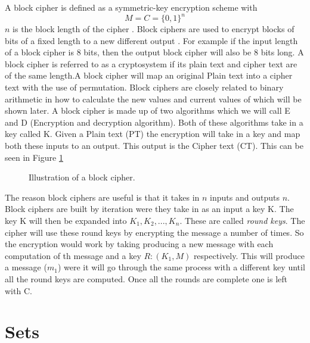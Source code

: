 \documentclass[11pt,a4paper]{report}
\begin{document}
A block cipher is defined as a symmetric-key encryption scheme with
\begin{displaymath}
 M = C = \{0,1\}^{n}
\end{displaymath}
$n$ is the block length of the cipher \cite{DBLP:series/isc/DelfsK07}. Block ciphers are used to encrypt blocks of bits of a fixed length to a new different output \cite{DBLP:books/sp/Buchmann02}. For example if the input length of a block cipher is 8 bits, then the output block cipher will also be 8 bits long. A block cipher is referred to as a cryptosystem if its plain text and cipher text are of the same length.A block cipher will map an original Plain text into a cipher text with the use of permutation. Block ciphers are closely related to binary arithmetic in how to calculate the new values and current values of which will be shown later.
A block cipher is made up of two algorithms which we will call E and D (Encryption and decryption algorithm). Both of these algorithms take in a key called K. Given a Plain text (PT) the encryption will take in a key and map both these inputs to an output. This output is the Cipher text (CT). This can be seen in Figure \ref*{fig:2.2.1}


\begin{figure}[H]
\centering
\caption{Illustration of a block cipher.}
\label{fig:2.2.1}
\end{figure}



The reason block ciphers are useful is that it takes in $n$ inputs and outputs $n$. Block ciphers are built by iteration were they take in as an input a key K. The key K will then be expanded into $K_{1}, K_{2},..., K_{n}$. These are called \emph{round keys}. The cipher will use these round keys by encrypting the message a number of times. So the encryption would work by taking producing a new message with each computation of th message and a key $R: (K_{1}, M)$ respectively. This will produce a message ($m_{1}$) were it will go through the same process with a different key until all the round keys are computed. Once all the rounds are complete one is left with C.

\section{Sets}
\label{sec:sets}
\end{document}
